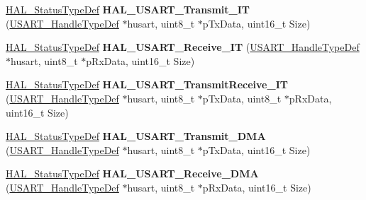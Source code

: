 \begin{DoxyCompactItemize}
\hyperlink{stm32f0xx__hal__def_8h_a63c0679d1cb8b8c684fbb0632743478f}{H\+A\+L\+\_\+\+Status\+Type\+Def} {\bfseries H\+A\+L\+\_\+\+U\+S\+A\+R\+T\+\_\+\+Transmit\+\_\+\+IT} (\hyperlink{struct_u_s_a_r_t___handle_type_def}{U\+S\+A\+R\+T\+\_\+\+Handle\+Type\+Def} $\ast$husart, uint8\+\_\+t $\ast$p\+Tx\+Data, uint16\+\_\+t Size)
\item 
\mbox{\label{group___u_s_a_r_t___exported___functions___group2_ga19816dd7809a5dba59f309172cb7ea2d}} 
\hyperlink{stm32f0xx__hal__def_8h_a63c0679d1cb8b8c684fbb0632743478f}{H\+A\+L\+\_\+\+Status\+Type\+Def} {\bfseries H\+A\+L\+\_\+\+U\+S\+A\+R\+T\+\_\+\+Receive\+\_\+\+IT} (\hyperlink{struct_u_s_a_r_t___handle_type_def}{U\+S\+A\+R\+T\+\_\+\+Handle\+Type\+Def} $\ast$husart, uint8\+\_\+t $\ast$p\+Rx\+Data, uint16\+\_\+t Size)
\item 
\mbox{\label{group___u_s_a_r_t___exported___functions___group2_gaf67f2b883594afd0027f10a518a3f595}} 
\hyperlink{stm32f0xx__hal__def_8h_a63c0679d1cb8b8c684fbb0632743478f}{H\+A\+L\+\_\+\+Status\+Type\+Def} {\bfseries H\+A\+L\+\_\+\+U\+S\+A\+R\+T\+\_\+\+Transmit\+Receive\+\_\+\+IT} (\hyperlink{struct_u_s_a_r_t___handle_type_def}{U\+S\+A\+R\+T\+\_\+\+Handle\+Type\+Def} $\ast$husart, uint8\+\_\+t $\ast$p\+Tx\+Data, uint8\+\_\+t $\ast$p\+Rx\+Data, uint16\+\_\+t Size)
\item 
\mbox{\label{group___u_s_a_r_t___exported___functions___group2_ga3d52e7ec93f6111e87c11daa8c00d1a1}} 
\hyperlink{stm32f0xx__hal__def_8h_a63c0679d1cb8b8c684fbb0632743478f}{H\+A\+L\+\_\+\+Status\+Type\+Def} {\bfseries H\+A\+L\+\_\+\+U\+S\+A\+R\+T\+\_\+\+Transmit\+\_\+\+D\+MA} (\hyperlink{struct_u_s_a_r_t___handle_type_def}{U\+S\+A\+R\+T\+\_\+\+Handle\+Type\+Def} $\ast$husart, uint8\+\_\+t $\ast$p\+Tx\+Data, uint16\+\_\+t Size)
\item 
\mbox{\label{group___u_s_a_r_t___exported___functions___group2_gab0322771e1ddbb8c2ac6dd75e7e1c90e}} 
\hyperlink{stm32f0xx__hal__def_8h_a63c0679d1cb8b8c684fbb0632743478f}{H\+A\+L\+\_\+\+Status\+Type\+Def} {\bfseries H\+A\+L\+\_\+\+U\+S\+A\+R\+T\+\_\+\+Receive\+\_\+\+D\+MA} (\hyperlink{struct_u_s_a_r_t___handle_type_def}{U\+S\+A\+R\+T\+\_\+\+Handle\+Type\+Def} $\ast$husart, uint8\+\_\+t $\ast$p\+Rx\+Data, uint16\+\_\+t Size)

\end{DoxyCompactItemize}
